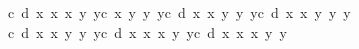 \begin{isabellebody}
\ \ \ \ {\isacharplus}c{\isacharasterisk}\ d{\isacharasterisk}\ x{}{\isacharasterisk}\ x{}{\isacharcircum}{}{\isacharasterisk}\ x{}{\isacharcircum}{}{\isacharasterisk}\ y{}{\isacharcircum}{}{\isacharasterisk}\ y{}{\isacharcircum}{}{\isacharminus}c{\isacharcircum}{}{\isacharasterisk}\ x{}{\isacharcircum}{}{\isacharasterisk}\ y{}{\isacharasterisk}\ y{}{\isacharasterisk}\ y{}{\isacharcircum}{}{\isacharplus}c{\isacharasterisk}\ d{\isacharasterisk}\ x{}{\isacharcircum}{}{\isacharasterisk}\ x{}{\isacharcircum}{}{\isacharasterisk}\ y{}{\isacharasterisk}\ y{}{\isacharasterisk}\ y{}{\isacharcircum}{}{\isacharplus}c{\isacharcircum}{}{\isacharasterisk}\ d{\isacharasterisk}\ x{}{\isacharcircum}{}{\isacharasterisk}\ x{}{\isacharcircum}{}{\isacharasterisk}\ y{}{\isacharcircum}{}{\isacharasterisk}\ y{}{\isacharasterisk}\ y{}{\isacharcircum}{}\isanewline
\ \ \ \ {\isacharminus}c{\isacharcircum}{}{\isacharasterisk}\ d{\isacharasterisk}\ x{}{\isacharcircum}{}{\isacharasterisk}\ x{}{\isacharcircum}{}{\isacharasterisk}\ y{}{\isacharcircum}{}{\isacharasterisk}\ y{}{\isacharasterisk}\ y{}{\isacharcircum}{}{\isacharplus}c{\isacharasterisk}\ d{\isacharasterisk}\ x{}{\isacharasterisk}\ x{}{\isacharasterisk}\ x{}{\isacharcircum}{}{\isacharasterisk}\ y{}{\isacharcircum}{}{\isacharasterisk}\ y{}{\isacharcircum}{}{\isacharminus}c{\isacharasterisk}\ d\ {\isacharasterisk}x{}{\isacharcircum}{}{\isacharasterisk}\ x{}{\isacharasterisk}\ x{}{\isacharcircum}{}{\isacharasterisk}\ y{}{\isacharcircum}{}{\isacharasterisk}\ y{}{\isacharcircum}{}\isanewline

\end{isabellebody}
